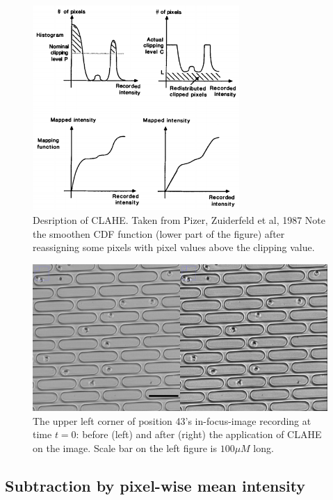\documentclass[pdftex,12pt,a4paper]{report}
\begin{document}
\begin{figure}[H]
\centering
\includegraphics[width=0.7\textwidth]{images/clahe}
\caption{Desription of CLAHE. Taken from Pizer, Zuiderfeld et al, 1987 \cite{pizer1987adaptive}  Note the  smoothen CDF function (lower part of the figure) after reassigning some pixels with pixel values above the clipping value.}
\label{fig:clahe}
\end{figure}

\begin{figure}[H]
\centering
\includegraphics[width=\textwidth]{images/clahe_before_after}
\caption{The upper left corner of position 43's in-focus-image recording at time $t=0$: before (left) and after (right) the application of CLAHE on the image. Scale bar on the left figure is $100 \mu M$ long.}
\label{fig:clahe_before_after}
\end{figure}

\subsection{Subtraction by pixel-wise mean intensity}
\label{subsection:substraction_by_mean}
\end{document}
